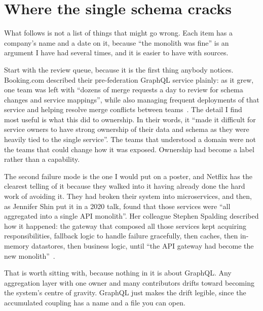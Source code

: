 \section{Where the single schema cracks}
\label{sec:ch01-cracks}

What follows is not a list of things that might go wrong. Each item has a
company's name and a date on it, because \enquote{the monolith was fine} is an
argument I have had several times, and it is easier to have with sources.

%
Start with the review queue, because it is the first thing anybody notices.
Booking.com described their pre-federation GraphQL service plainly: as it grew,
one team was left with \enquote{dozens of merge requests a day to review for
schema changes and service mappings}, while also managing frequent deployments
of that service and helping resolve merge conflicts between
teams~\autocite{ernst2022booking}. The detail I find most useful is what this did
to ownership. In their words, it \enquote{made it difficult for service owners
to have strong ownership of their data and schema as they were heavily tied to
the single service}. The teams that understood a domain were not the teams that
could change how it was exposed. Ownership had become a label rather than a
capability.

%
The second failure mode is the one I would put on a poster, and Netflix has the
clearest telling of it because they walked into it having already done the hard
work of avoiding it. They had broken their system into microservices, and then,
as Jennifer Shin put it in a 2020 talk, found that those services were
\enquote{all aggregated into a single API monolith}. Her colleague Stephen
Spalding described how it happened: the gateway that composed all those services
kept acquiring responsibilities, fallback logic to handle failure gracefully,
then caches, then in-memory datastores, then business logic, until \enquote{the
API gateway had become the new monolith}~\autocite{shin2020netflixtalk}.

That is worth sitting with, because nothing in it is about GraphQL. Any
aggregation layer with one owner and many contributors drifts toward becoming
the system's centre of gravity. GraphQL just makes the drift legible, since the
accumulated coupling has a name and a file you can open.

